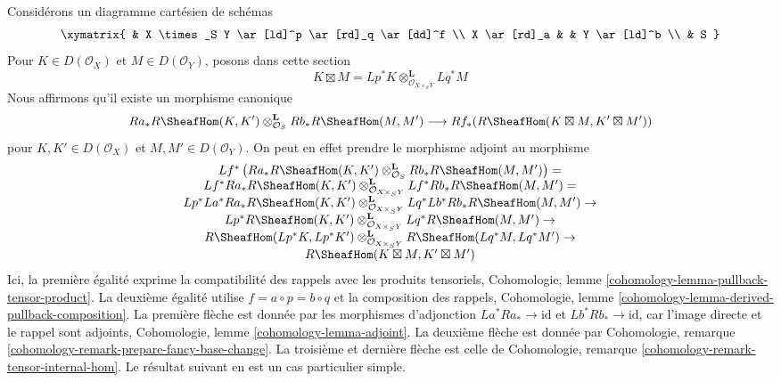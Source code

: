 \noindent
Considérons un diagramme cartésien de schémas
$$
\xymatrix{
& X \times_S Y \ar[ld]^p \ar[rd]_q \ar[dd]^f \\
X \ar[rd]_a & & Y \ar[ld]^b \\
& S
}
$$
Pour $K \in D(\mathcal{O}_X)$ et $M \in D(\mathcal{O}_Y)$,
posons dans cette section
$$
K \boxtimes M =
Lp^*K \otimes_{\mathcal{O}_{X \times_S Y}}^\mathbf{L} Lq^*M
$$
Nous affirmons qu'il existe un morphisme canonique
\begin{equation}
\label{equation-kunneth-ext}
Ra_*R\SheafHom(K, K')
\otimes_{\mathcal{O}_S}^\mathbf{L}
Rb_*R\SheafHom(M, M')
\longrightarrow
Rf_*(R\SheafHom(K \boxtimes M, K' \boxtimes M'))
\end{equation}
pour $K, K' \in D(\mathcal{O}_X)$ et $M, M' \in D(\mathcal{O}_Y)$.
On peut en effet prendre le morphisme adjoint au morphisme
$$
\begin{matrix}
Lf^*\left(Ra_*R\SheafHom(K, K')
\otimes_{\mathcal{O}_S}^\mathbf{L}
Rb_* R\SheafHom(M, M')\right) = \\
Lf^* Ra_* R\SheafHom(K, K')
\otimes_{\mathcal{O}_{X \times_S Y}}^\mathbf{L}
Lf^* Rb_* R\SheafHom(M, M') = \\
Lp^* La^* Ra_* R\SheafHom(K, K')
\otimes_{\mathcal{O}_{X \times_S Y}}^\mathbf{L}
Lq^* Lb^* Rb_* R\SheafHom(M, M') \to \\
Lp^* R\SheafHom(K, K')
\otimes_{\mathcal{O}_{X \times_S Y}}^\mathbf{L}
Lq^* R\SheafHom(M, M') \to \\
R\SheafHom(Lp^*K, Lp^*K')
\otimes_{\mathcal{O}_{X \times_S Y}}^\mathbf{L}
R\SheafHom(Lq^*M, Lq^*M') \to \\
R\SheafHom(K \boxtimes M, K' \boxtimes M')
\end{matrix}
$$
Ici, la première égalité exprime la compatibilité des rappels avec les produits tensoriels,
Cohomologie, lemme \ref{cohomology-lemma-pullback-tensor-product}.
La deuxième égalité utilise $f = a \circ p = b \circ q$ et
la composition des rappels,
Cohomologie, lemme \ref{cohomology-lemma-derived-pullback-composition}.
La première flèche est donnée par les morphismes d'adjonction
$La^* Ra_* \to \text{id}$ et
$Lb^* Rb_* \to \text{id}$, car l'image directe et le rappel sont adjoints,
Cohomologie, lemme \ref{cohomology-lemma-adjoint}.
La deuxième flèche est donnée par
Cohomologie, remarque \ref{cohomology-remark-prepare-fancy-base-change}.
La troisième et dernière flèche est celle de
Cohomologie, remarque \ref{cohomology-remark-tensor-internal-hom}.
Le résultat suivant en est un cas particulier simple.

